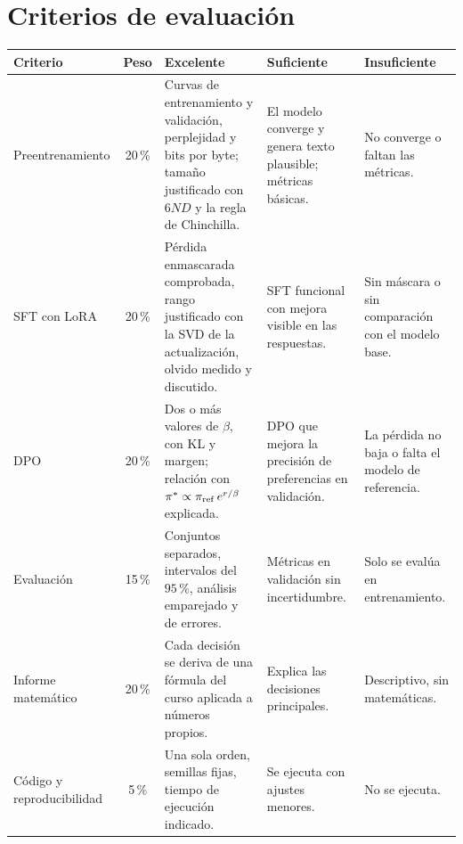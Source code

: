 \section*{Criterios de evaluación}
\begin{center}
\small
\renewcommand{\arraystretch}{1.15}
\begin{tabularx}{\textwidth}{@{}>{\raggedright\arraybackslash}p{2.7cm}c>{\raggedright\arraybackslash}X>{\raggedright\arraybackslash}X>{\raggedright\arraybackslash}X@{}}
\toprule
Criterio & Peso & Excelente & Suficiente & Insuficiente \\
\midrule
Preentrenamiento & 20\,\% & Curvas de entrenamiento y validación, perplejidad y bits por byte; tamaño justificado con $6ND$ y la regla de Chinchilla. & El modelo converge y genera texto plausible; métricas básicas. & No converge o faltan las métricas. \\
\addlinespace
SFT con LoRA & 20\,\% & Pérdida enmascarada comprobada, rango justificado con la SVD de la actualización, olvido medido y discutido. & SFT funcional con mejora visible en las respuestas. & Sin máscara o sin comparación con el modelo base. \\
\addlinespace
DPO & 20\,\% & Dos o más valores de $\beta$, con KL y margen; relación con $\pi^{*}\propto\pi_{\mathrm{ref}}\,e^{r/\beta}$ explicada. & DPO que mejora la precisión de preferencias en validación. & La pérdida no baja o falta el modelo de referencia. \\
\addlinespace
Evaluación & 15\,\% & Conjuntos separados, intervalos del $95\,\%$, análisis emparejado y de errores. & Métricas en validación sin incertidumbre. & Solo se evalúa en entrenamiento. \\
\addlinespace
Informe matemático & 20\,\% & Cada decisión se deriva de una fórmula del curso aplicada a números propios. & Explica las decisiones principales. & Descriptivo, sin matemáticas. \\
\addlinespace
Código y reproducibilidad & 5\,\% & Una sola orden, semillas fijas, tiempo de ejecución indicado. & Se ejecuta con ajustes menores. & No se ejecuta. \\
\bottomrule
\end{tabularx}
\end{center}
